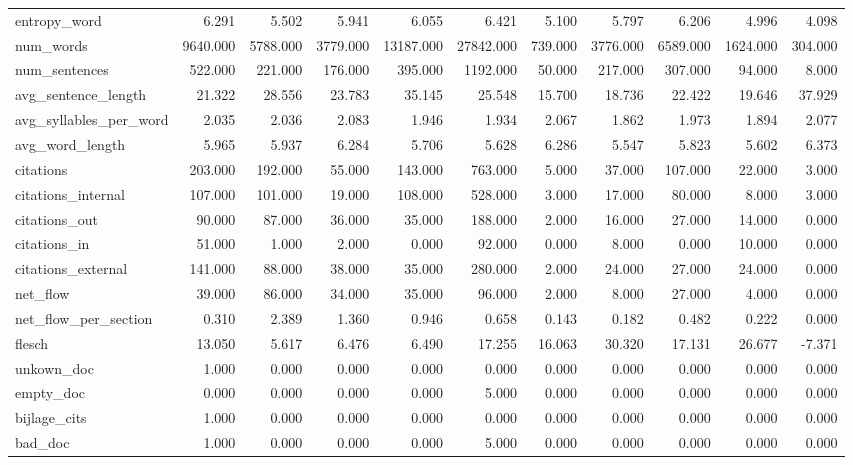 \begin{tabular}{lrrrrrrrrrr}
\cline{1-11}
entropy\_word & 6.291 & 5.502 & 5.941 & 6.055 & 6.421 & 5.100 & 5.797 & 6.206 & 4.996 & 4.098 \\
\cline{1-11}
num\_words & 9640.000 & 5788.000 & 3779.000 & 13187.000 & 27842.000 & 739.000 & 3776.000 & 6589.000 & 1624.000 & 304.000 \\
\cline{1-11}
num\_sentences & 522.000 & 221.000 & 176.000 & 395.000 & 1192.000 & 50.000 & 217.000 & 307.000 & 94.000 & 8.000 \\
\cline{1-11}
avg\_sentence\_length & 21.322 & 28.556 & 23.783 & 35.145 & 25.548 & 15.700 & 18.736 & 22.422 & 19.646 & 37.929 \\
\cline{1-11}
avg\_syllables\_per\_word & 2.035 & 2.036 & 2.083 & 1.946 & 1.934 & 2.067 & 1.862 & 1.973 & 1.894 & 2.077 \\
\cline{1-11}
avg\_word\_length & 5.965 & 5.937 & 6.284 & 5.706 & 5.628 & 6.286 & 5.547 & 5.823 & 5.602 & 6.373 \\
\cline{1-11}
citations & 203.000 & 192.000 & 55.000 & 143.000 & 763.000 & 5.000 & 37.000 & 107.000 & 22.000 & 3.000 \\
\cline{1-11}
citations\_internal & 107.000 & 101.000 & 19.000 & 108.000 & 528.000 & 3.000 & 17.000 & 80.000 & 8.000 & 3.000 \\
\cline{1-11}
citations\_out & 90.000 & 87.000 & 36.000 & 35.000 & 188.000 & 2.000 & 16.000 & 27.000 & 14.000 & 0.000 \\
\cline{1-11}
citations\_in & 51.000 & 1.000 & 2.000 & 0.000 & 92.000 & 0.000 & 8.000 & 0.000 & 10.000 & 0.000 \\
\cline{1-11}
citations\_external & 141.000 & 88.000 & 38.000 & 35.000 & 280.000 & 2.000 & 24.000 & 27.000 & 24.000 & 0.000 \\
\cline{1-11}
net\_flow & 39.000 & 86.000 & 34.000 & 35.000 & 96.000 & 2.000 & 8.000 & 27.000 & 4.000 & 0.000 \\
\cline{1-11}
net\_flow\_per\_section & 0.310 & 2.389 & 1.360 & 0.946 & 0.658 & 0.143 & 0.182 & 0.482 & 0.222 & 0.000 \\
\cline{1-11}
flesch & 13.050 & 5.617 & 6.476 & 6.490 & 17.255 & 16.063 & 30.320 & 17.131 & 26.677 & -7.371 \\
\cline{1-11}
unkown\_doc & 1.000 & 0.000 & 0.000 & 0.000 & 0.000 & 0.000 & 0.000 & 0.000 & 0.000 & 0.000 \\
\cline{1-11}
empty\_doc & 0.000 & 0.000 & 0.000 & 0.000 & 5.000 & 0.000 & 0.000 & 0.000 & 0.000 & 0.000 \\
\cline{1-11}
bijlage\_cits & 1.000 & 0.000 & 0.000 & 0.000 & 0.000 & 0.000 & 0.000 & 0.000 & 0.000 & 0.000 \\
\cline{1-11}
bad\_doc & 1.000 & 0.000 & 0.000 & 0.000 & 5.000 & 0.000 & 0.000 & 0.000 & 0.000 & 0.000 \\
\cline{1-11}
\bottomrule
\end{tabular}
